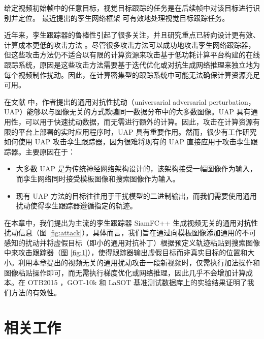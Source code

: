 给定视频初始帧中的任意目标，视觉目标跟踪的任务是在后续帧中对该目标进行识别并定位。
最近提出的孪生网络框架 \cite{SiamFC,SiamRPN,SiamRPN++,SiamFC++} 可有效地处理视觉目标跟踪任务。

近年来，孪生跟踪器的鲁棒性引起了很多关注，并且研究重点已转向设计更有效、计算成本更低的攻击方法 \cite{TTP,FAN,SPARK}。尽管很多攻击方法可以成功地攻击孪生网络跟踪器，但这些攻击方法仍不适合以有限的计算资源来攻击基于低功耗计算平台构建的在线跟踪系统，原因是这些攻击方法需要基于迭代优化或对抗生成网络推理来独立地为每个视频制作扰动。因此，在计算密集型的跟踪系统中可能无法确保计算资源充足可用。

在文献 \cite{UAP} 中，作者提出的通用对抗性扰动（universarial adversarial perturbation，UAP）能够以与图像无关的方式欺骗同一数据分布中的大多数图像。UAP 具有通用性，可以用于快速扰动数据，而无需进行额外的计算。因此，攻击在计算资源有限的平台上部署的实时应用程序时，UAP 具有重要作用。然而，很少有工作研究如何使用 UAP 攻击孪生跟踪器，因为很难将现有的 UAP 直接应用于攻击孪生跟踪器。主要原因在于：
\begin{itemize}
\item 大多数 UAP 是为传统神经网络架构设计的，该架构接受一幅图像作为输入，而孪生网络同时接受模板图像和搜索图像作为输入。
\item 现有 UAP 方法的目标往往用于干扰模型的二进制输出，而我们需要使用通用扰动使得孪生跟踪器遵循指定的轨迹。
\end{itemize}

在本章中，我们提出为主流的孪生跟踪器 SiamFC++ \cite{SiamFC++} 生成视频无关的通用对抗性扰动信息（图 \ref{fig:attack}）。具体而言，我们旨在通过向模板图像添加通用的不可感知的扰动并将虚假目标（即小的通用对抗补丁）根据预定义轨迹粘贴到搜索图像中来攻击跟踪器（图 \ref{fig:1}），使得跟踪器输出虚假目标而非真实目标的位置和大小。利用本章提出的视频无关的通用扰动攻击一段新视频时，仅需执行加法操作和图像粘贴操作即可，而无需执行梯度优化或网络推理，因此几乎不会增加计算成本。在 OTB2015 \cite{OTB}，GOT-10k \cite{GOT-10k} 和 LaSOT \cite{LaSOT} 基准测试数据库上的实验结果证明了我们方法的有效性。
\section{相关工作}

